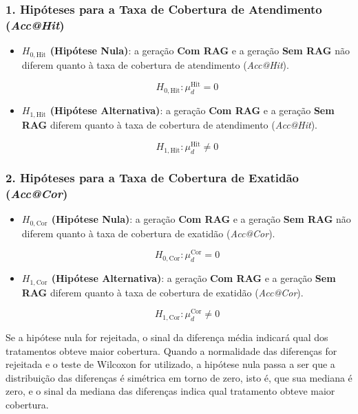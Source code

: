 \subsubsection*{1. Hipóteses para a Taxa de Cobertura de Atendimento (\textit{Acc@Hit})}

\begin{itemize}
    \item \textbf{$H_{0,\mathrm{Hit}}$ (Hipótese Nula)}: a geração \textbf{Com RAG} e a geração \textbf{Sem RAG} não diferem quanto à taxa de cobertura de atendimento (\textit{Acc@Hit}).

    \[
    H_{0,\mathrm{Hit}}: \mu_d^{\mathrm{Hit}} = 0
    \]

    \item \textbf{$H_{1,\mathrm{Hit}}$ (Hipótese Alternativa)}: a geração \textbf{Com RAG} e a geração \textbf{Sem RAG} diferem quanto à taxa de cobertura de atendimento (\textit{Acc@Hit}).

    \[
    H_{1,\mathrm{Hit}}: \mu_d^{\mathrm{Hit}} \neq 0
    \]
\end{itemize}

\subsubsection*{2. Hipóteses para a Taxa de Cobertura de Exatidão (\textit{Acc@Cor})}

\begin{itemize}
    \item \textbf{$H_{0,\mathrm{Cor}}$ (Hipótese Nula)}: a geração \textbf{Com RAG} e a geração \textbf{Sem RAG} não diferem quanto à taxa de cobertura de exatidão (\textit{Acc@Cor}).

    \[
    H_{0,\mathrm{Cor}}: \mu_d^{\mathrm{Cor}} = 0
    \]

    \item \textbf{$H_{1,\mathrm{Cor}}$ (Hipótese Alternativa)}: a geração \textbf{Com RAG} e a geração \textbf{Sem RAG} diferem quanto à taxa de cobertura de exatidão (\textit{Acc@Cor}).

    \[
    H_{1,\mathrm{Cor}}: \mu_d^{\mathrm{Cor}} \neq 0
    \]
\end{itemize}

Se a hipótese nula for rejeitada, o sinal da diferença média indicará qual dos tratamentos obteve maior cobertura. Quando a normalidade das diferenças for rejeitada e o teste de Wilcoxon for utilizado, a hipótese nula passa a ser que a distribuição das diferenças é simétrica em torno de zero, isto é, que sua mediana é zero, e o sinal da mediana das diferenças indica qual tratamento obteve maior cobertura.


